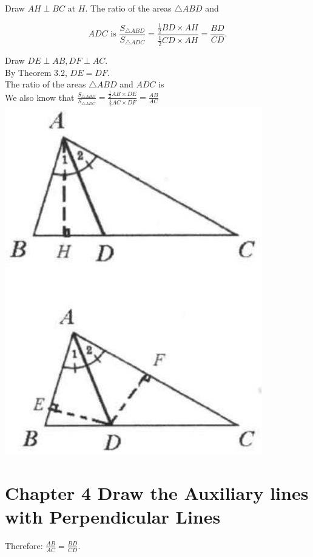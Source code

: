 \documentclass[10pt]{article}
\begin{document}
Draw \(A H \perp B C\) at \(H\). The ratio of the areas \(\triangle A B D\) and

\[
A D C \text { is } \frac{S_{\triangle A B D}}{S_{\triangle A D C}}=\frac{\frac{1}{2} B D \times A H}{\frac{1}{2} C D \times A H}=\frac{B D}{C D} .
\]

Draw \(D E \perp A B, D F \perp A C\).\\
By Theorem 3.2, \(D E=D F\).\\
The ratio of the areas \(\triangle A B D\) and \(A D C\) is\\
We also know that \(\frac{S_{\triangle A B D}}{S_{\triangle A D C}}=\frac{\frac{1}{2} A B \times D E}{\frac{1}{2} A C \times D F}=\frac{A B}{A C}\)\\
\includegraphics[max width=\textwidth, center]{2025_04_17_97bc1f7e44d93c271a88g-075(2)}

\section*{Chapter 4 Draw the Auxiliary lines with Perpendicular Lines}
Therefore: \(\frac{A B}{A C}=\frac{B D}{C D}\).
\end{document}
